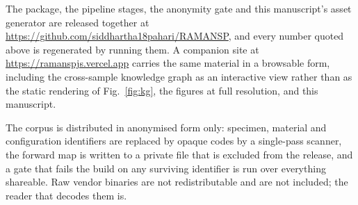 The \ramansp{} package, the pipeline stages, the anonymity gate and this
manuscript's asset generator are released together at
\url{https://github.com/siddhartha18pahari/RAMANSP}, and every number quoted
above is regenerated by running them. A companion site at
\url{https://ramanspjs.vercel.app} carries the same material in a browsable form,
including the cross-sample knowledge graph as an interactive view rather than
as the static rendering of Fig.~\ref{fig:kg}, the figures at full resolution,
and this manuscript.

The corpus is distributed in anonymised form only: specimen, material and
configuration identifiers are replaced by opaque codes by a single-pass
scanner, the forward map is written to a private file that is excluded from the
release, and a gate that fails the build on any surviving identifier is run
over everything shareable. Raw vendor binaries are not redistributable and are
not included; the reader that decodes them is.
